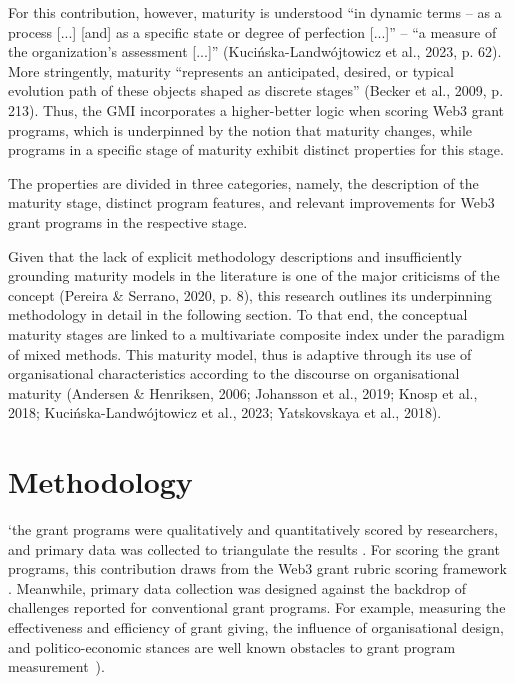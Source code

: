 \documentclass[conference]{IEEEtran}
\begin{document}
For this contribution, however, maturity is understood “in dynamic terms – as a process [...] [and] as a specific state or degree of perfection [...]” – “a measure of the organization’s assessment [...]” (Kucińska-Landwójtowicz et al., 2023, p. 62). More stringently, maturity “represents an anticipated, desired, or typical evolution path of these objects shaped as discrete stages” (Becker et al., 2009, p. 213). Thus, the GMI incorporates a higher-better logic when scoring Web3 grant programs, which is underpinned by the notion that maturity changes, while programs in a specific stage of maturity exhibit distinct properties for this stage. 

The properties are divided in three categories, namely, the description of the maturity stage, distinct program features, and relevant improvements for Web3 grant programs in the respective stage. 

Given that the lack of explicit methodology descriptions and insufficiently grounding maturity models in the literature is one of the major criticisms of the concept (Pereira \& Serrano, 2020, p. 8), this research outlines its underpinning methodology in detail in the following section. To that end, the conceptual maturity stages are linked to a multivariate composite index under the paradigm of mixed methods. This maturity model, thus is adaptive through its use of organisational characteristics according to the discourse on organisational maturity (Andersen \& Henriksen, 2006; Johansson et al., 2019; Knosp et al., 2018; Kucińska-Landwójtowicz et al., 2023; Yatskovskaya et al., 2018). 



\section{Methodology}\label{sec_3}


`the grant programs were qualitatively and quantitatively scored by researchers, and primary data was collected to triangulate the results \cite{creswell_designing_2017,datta_paradigm_2006}. For scoring the grant programs, this contribution draws from the Web3 grant rubric scoring framework \cite{biedermann_evaluating_2024}. Meanwhile, primary data collection was designed against the backdrop of challenges reported for conventional grant programs. For example, measuring the effectiveness and efficiency of grant giving, the influence of organisational design, and politico-economic stances are well known obstacles to grant program measurement~\cite{lerner_government_2000}).
\end{document}
